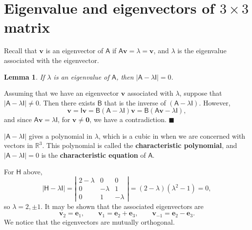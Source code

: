 \documentclass[letter-paper]{tufte-book}
\newtheorem{lemma}[theorem]{\color{pastel-blue}Lemma}
\newenvironment{proof}[1][Proof]{\begin{trivlist}
\item[\hskip \labelsep {\bfseries #1}]}{\end{trivlist}}
\newenvironment{example}[1][Example]{\begin{trivlist}
\item[\hskip \labelsep {\bfseries #1}]}{\end{trivlist}}
\newcommand{\eb}{\boldsymbol{e}}
\newcommand{\vb}{\boldsymbol{v}}
\newcommand\Def[1]{\textbf{#1}}
\newcommand{\qed}{\hfill$\blacksquare$}
\begin{document}
\section{Eigenvalue and eigenvectors of $3\times3$ matrix}

Recall that $\vb$ is an eigenvector of $\mathsf{A}$ if
$\mathsf{A}\vb=\lambda=\vb$, and $\lambda$ is the eigenvalue associated with the
eigenvector.
\begin{lemma}
	If $\lambda$ is an eigenvalue of $\mathsf{A}$, then
	$|\mathsf{A}-\lambda\mathsf{I}|=0$.
\end{lemma}
\begin{proof}
	Assuming that we have an eigenvector $\vb$ associated with $\lambda$,
	suppose that $|\mathsf{A}-\lambda\mathsf{I}|\neq0$. Then there exists
	$\mathsf{B}$ that is the inverse of $(\mathsf{A}-\lambda\mathsf{I})$.
	However,
	\begin{equation*}
		\vb=\mathsf{I}\vb=\mathsf{B}(\mathsf{A}-\lambda\mathsf{I})\vb=
		\mathsf{B}(\mathsf{A}\vb-\lambda\mathsf{I}),
	\end{equation*}
	and since $\mathsf{A}\vb=\lambda\mathsf{I}$, for $\vb\neq\boldsymbol{0}$, we
	have a contradiction. \qed
\end{proof}
$|\mathsf{A}-\lambda\mathsf{I}|$ gives a polynomial in $\lambda$, which is a
cubic in when we are concerned with vectors in $\mathbb{R}^3$. This polynomial
is called the \Def{characteristic polynomial}, and
$|\mathsf{A}-\lambda\mathsf{I}|=0$ is the \Def{characteristic equation} of
$\mathsf{A}$.
\begin{example}
	For $\mathsf{H}$ above,
	\begin{equation*}
		|\mathsf{H}-\lambda\mathsf{I}|=\left|\begin{matrix}
		2-\lambda & 0 & 0\\ 0 & -\lambda & 1 \\ 0 & 1 & -\lambda\end{matrix}
		\right|= (2-\lambda)(\lambda^2-1)=0,
	\end{equation*}
	so $\lambda=2,\pm1$. It may be shown that the associated eigenvectors are
	\begin{equation*}
		\vb_2 = \eb_1,\qquad \vb_1 = \eb_2 + \eb_3,\qquad
		\vb_{-1} = \eb_2-\eb_3.
	\end{equation*}
	We notice that the eigenvectors are mutually orthogonal.
\end{example}
\end{document}
